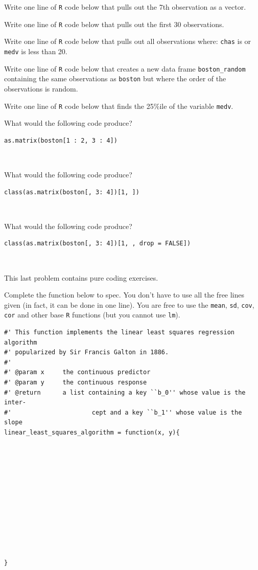 \documentclass[12pt]{article}
\begin{document}
 Write one line of \texttt{R} code below that pulls out the 7th observation as a vector. 

 Write one line of \texttt{R} code below that pulls out the first 30 observations. 

 Write one line of \texttt{R} code below that pulls out all observations where: \texttt{chas} is  or \texttt{medv} is less than 20. 

 Write one line of \texttt{R} code below that creates a new data frame \texttt{boston\_random} containing the same observations as \texttt{boston} but where the order of the observations is random. 

 Write one line of \texttt{R} code below that finds the 25\%ile of the variable \texttt{medv}. 

 What would the following code produce?

\begin{lstlisting}
as.matrix(boston[1 : 2, 3 : 4])
\end{lstlisting}
~

 What would the following code produce?

\begin{lstlisting}
class(as.matrix(boston[, 3: 4])[1, ])
\end{lstlisting}
~


 What would the following code produce?

\begin{lstlisting}
class(as.matrix(boston[, 3: 4])[1, , drop = FALSE])
\end{lstlisting}
~

\eenum

\problem This last problem contains pure coding exercises. 

\benum

 Complete the function below to spec. You don't have to use all the free lines given (in fact, it can be done in one line). You are free to use the \texttt{mean}, \texttt{sd}, \texttt{cov}, \texttt{cor} and other base \texttt{R} functions (but you cannot use \texttt{lm}). 

\begin{lstlisting}
#' This function implements the linear least squares regression algorithm
#' popularized by Sir Francis Galton in 1886.
#'
#' @param x		the continuous predictor
#' @param y		the continuous response 	
#' @return 		a list containing a key ``b_0'' whose value is the inter-
#'						cept and a key ``b_1'' whose value is the slope
linear_least_squares_algorithm = function(x, y){












}
\end{lstlisting}
\end{document}
